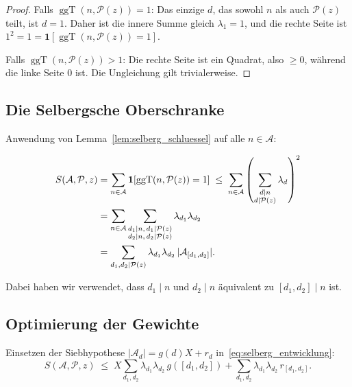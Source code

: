 \documentclass[12pt,a4paper]{amsart}
\theoremstyle{definition}
\DeclareMathOperator{\ggT}{ggT}
\begin{document}
\begin{proof}
  Falls $\ggT(n, \mathcal{P}(z)) = 1$: Das einzige $d$, das sowohl $n$ als auch
  $\mathcal{P}(z)$ teilt, ist $d = 1$.  Daher ist die innere Summe gleich
  $\lambda_1 = 1$, und die rechte Seite ist $1^2 = 1 = \mathbf{1}[\ggT(n,\mathcal{P}(z))=1]$.

  Falls $\ggT(n, \mathcal{P}(z)) > 1$: Die rechte Seite ist ein Quadrat, also
  $\geq 0$, während die linke Seite $0$ ist.  Die Ungleichung gilt trivialerweise.
\end{proof}

\subsection{Die Selbergsche Oberschranke}

Anwendung von Lemma~\ref{lem:selberg_schluessel} auf alle $n \in \mathcal{A}$:

\begin{align}
  S(\mathcal{A}, \mathcal{P}, z)
  &= \sum_{n \in \mathcal{A}} \mathbf{1}[\ggT(n,\mathcal{P}(z))=1]
  \;\leq\; \sum_{n \in \mathcal{A}}
    \left(\sum_{\substack{d \mid n \\ d \mid \mathcal{P}(z)}} \lambda_d\right)^2 \notag \\
  &= \sum_{n \in \mathcal{A}}
     \sum_{\substack{d_1 \mid n,\, d_1 \mid \mathcal{P}(z)\\
                     d_2 \mid n,\, d_2 \mid \mathcal{P}(z)}}
     \lambda_{d_1} \lambda_{d_2} \notag \\
  &= \sum_{\substack{d_1, d_2 \mid \mathcal{P}(z)}}
     \lambda_{d_1} \lambda_{d_2}\, |\mathcal{A}_{[d_1,d_2]}|. \label{eq:selberg_entwicklung}
\end{align}

Dabei haben wir verwendet, dass $d_1 \mid n$ und $d_2 \mid n$ äquivalent zu
$[d_1,d_2] \mid n$ ist.

\subsection{Optimierung der Gewichte}

Einsetzen der Siebhypothese $|\mathcal{A}_d| = g(d)X + r_d$ in~\eqref{eq:selberg_entwicklung}:
\begin{equation}\label{eq:selberg_aufspaltung}
  S(\mathcal{A},\mathcal{P},z)
  \;\leq\; X \sum_{d_1,d_2} \lambda_{d_1}\lambda_{d_2}\, g([d_1,d_2])
             + \sum_{d_1,d_2} \lambda_{d_1}\lambda_{d_2}\, r_{[d_1,d_2]}.
\end{equation}
\end{document}
